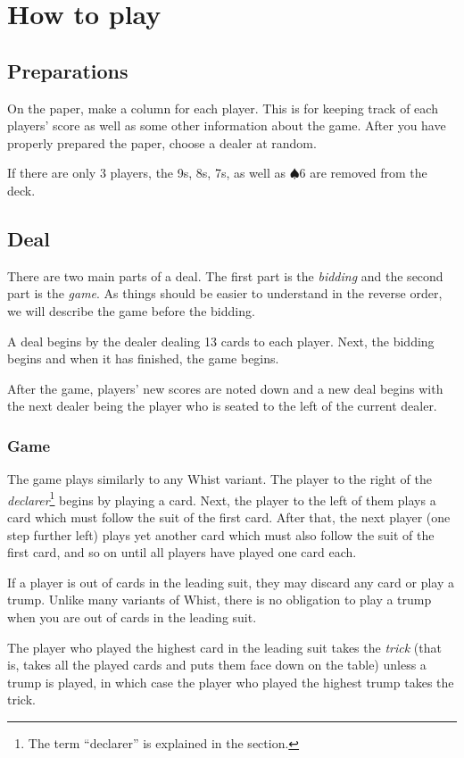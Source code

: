 \documentclass[a4paper]{article}
\begin{document}
	\section{How to play}{%
		\subsection{Preparations}{%
			On the paper, make a column for each player. This is for keeping track of each players' score as well as some other information about the game. After you have properly prepared the paper, choose a dealer at random.

			If there are only 3 players, the 9s, 8s, 7s, as well as $\spadesuit 6$ are removed from the deck.
		}

		\subsection{Deal}{%
			There are two main parts of a deal. The first part is the \emph{bidding} and the second part is the \emph{game}. As things should be easier to understand in the reverse order, we will describe the game before the bidding.

			A deal begins by the dealer dealing 13 cards to each player. Next, the bidding begins and when it has finished, the game begins.

			After the game, players' new scores are noted down and a new deal begins with the next dealer being the player who is seated to the left of the current dealer.

			\subsubsection{Game}{%
				The game plays similarly to any Whist variant. The player to the right of the \emph{declarer}\footnote{The term ``declarer'' is explained in the \textit{} section.} begins by playing a card. Next, the player to the left of them plays a card which must follow the suit of the first card. After that, the next player (one step further left) plays yet another card which must also follow the suit of the first card, and so on until all players have played one card each.

				If a player is out of cards in the leading suit, they may discard any card or play a trump. Unlike many variants of Whist, there is no obligation to play a trump when you are out of cards in the leading suit.

				The player who played the highest card in the leading suit takes the \emph{trick} (that is, takes all the played cards and puts them face down on the table) unless a trump is played, in which case the player who played the highest trump takes the trick.

}}}
\end{document}
